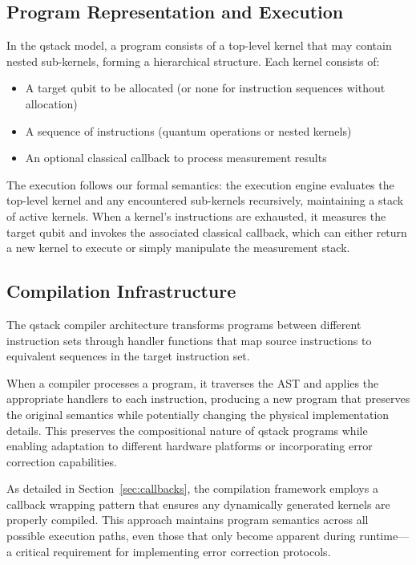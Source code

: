 \subsection{Program Representation and Execution}

In the qstack model, a program consists of a top-level kernel that may contain nested sub-kernels, forming a hierarchical structure. Each kernel consists of:

\begin{itemize}
\item A target qubit to be allocated (or none for instruction sequences without allocation)
\item A sequence of instructions (quantum operations or nested kernels)
\item An optional classical callback to process measurement results
\end{itemize}

The execution follows our formal semantics: the execution engine evaluates the top-level kernel and any encountered sub-kernels recursively, maintaining a stack of active kernels. When a kernel's instructions are exhausted, it measures the target qubit and invokes the associated classical callback, which can either return a new kernel to execute or simply manipulate the measurement stack.

\subsection{Compilation Infrastructure}

The qstack compiler architecture transforms programs between different instruction sets through handler functions that map source instructions to equivalent sequences in the target instruction set.

When a compiler processes a program, it traverses the AST and applies the appropriate handlers to each instruction, producing a new program that preserves the original semantics while potentially changing the physical implementation details. This preserves the compositional nature of qstack programs while enabling adaptation to different hardware platforms or incorporating error correction capabilities.

As detailed in Section~\ref{sec:callbacks}, the compilation framework employs a callback wrapping pattern that ensures any dynamically generated kernels are properly compiled. This approach maintains program semantics across all possible execution paths, even those that only become apparent during runtime—a critical requirement for implementing error correction protocols.

